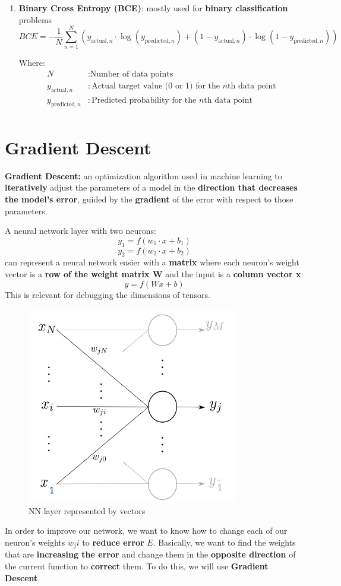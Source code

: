\begin{enumerate}
    \item \textbf{Binary Cross Entropy (BCE)}: mostly used for \textbf{binary classification} problems
\[
BCE = -\frac{1}{N} \sum_{n=1}^{N} \left( y_{\text{actual}, n} \cdot \log(y_{\text{predicted}, n}) + (1 - y_{\text{actual}, n}) \cdot \log(1 - y_{\text{predicted}, n}) \right)
\]

Where:
\begin{align*}
N &: \text{Number of data points} \\
y_{\text{actual}, n} &: \text{Actual target value (0 or 1) for the } n\text{th data point} \\
y_{\text{predicted}, n} &: \text{Predicted probability for the } n\text{th data point} \\
\end{align*}
\end{enumerate}

\section{Gradient Descent}
\begin{definition}
    \textbf{Gradient Descent:} an optimization algorithm used in machine learning to \textbf{iteratively} adjust the parameters of a model in the \textbf{direction that decreases the model's error}, guided by the \textbf{gradient} of the error with respect to those parameters.
\end{definition}

A neural network layer with two neurons: 
\[y_1 = f(w_1 \cdot x + b_1)\]
\[y_2 = f(w_2 \cdot x + b_2)\]
can represent a neural network easier with a \textbf{matrix} where each neuron's weight vector is a \textbf{row of the weight matrix W} and the input is a \textbf{column vector x}:
\[y=f(Wx+b)\]
This is relevant for debugging the dimensions of tensors.

\begin{figure}[h!t]
    \centering
    \includegraphics[width=0.3\linewidth]{twoneurons.png}
    \caption{NN layer represented by vectors}
    \label{fig:enter-label}
\end{figure}
In order to improve our network, we want to know how to change each of our neuron's weights \(w_ji\) to \textbf{reduce error} \(E\). Basically, we want to find the weights that are \textbf{increasing the error} and change them in the \textbf{opposite direction} of the current function to \textbf{correct} them. To do this, we will use \textbf{Gradient Descent}.


